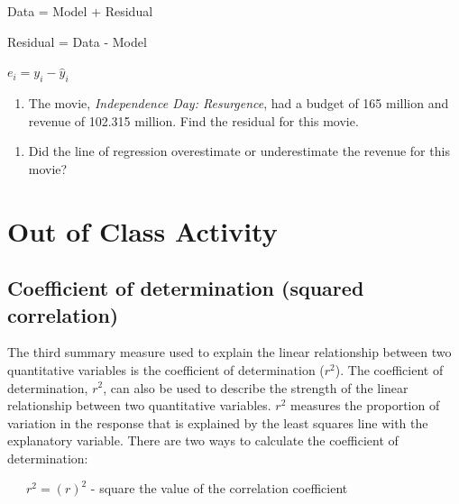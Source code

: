 \documentclass[
]{report}
\providecommand{\tightlist}{%
  \setlength{\itemsep}{0pt}\setlength{\parskip}{0pt}}
\begin{document}
\begin{center}
Data = Model + Residual

Residual = Data - Model

$e_i=y_i-\hat{y}_i$
\end{center}

\begin{enumerate}
\def\labelenumi{\arabic{enumi}.}
\setcounter{enumi}{13}
\tightlist
\item
  The movie, \emph{Independence Day: Resurgence}, had a budget of 165 million and revenue of 102.315 million. Find the residual for this movie.
\end{enumerate}

\vspace{.8in}

\begin{enumerate}
\def\labelenumi{\arabic{enumi}.}
\setcounter{enumi}{14}
\tightlist
\item
  Did the line of regression overestimate or underestimate the revenue for this movie?
\end{enumerate}

\vspace{.2in}

\hypertarget{out-of-class-activity}{%
\section{Out of Class Activity}\label{out-of-class-activity}}

\hypertarget{coefficient-of-determination-squared-correlation}{%
\subsection*{Coefficient of determination (squared correlation)}\label{coefficient-of-determination-squared-correlation}}

The third summary measure used to explain the linear relationship between two quantitative variables is the coefficient of determination (\(r^2\)). The coefficient of determination, \(r^2\), can also be used to describe the strength of the linear relationship between two quantitative variables. \(r^2\) measures the proportion of variation in the response that is explained by the least squares line with the explanatory variable. There are two ways to calculate the coefficient of determination:

~~~\(r^2 = (r)^2\) - square the value of the correlation coefficient
\end{document}

